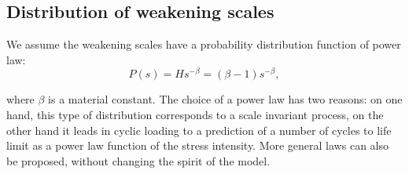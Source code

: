 \vspace{6pt}

\subsection{Distribution of weakening scales}

We assume the weakening scales have a  probability distribution function of power law:
\begin{equation}
P(s) = Hs^{-\beta}=(\beta-1)s^{-\beta},
\label{eq.ps}
\end{equation}

where $\beta$ is a material constant. 
The choice of a power law has two reasons: on one hand, this type of distribution corresponds to a scale invariant process, on the other hand it leads in cyclic loading to a prediction of a number of cycles to life limit as a power law function of the stress intensity. More general laws can also be proposed, without changing the spirit of the model.

